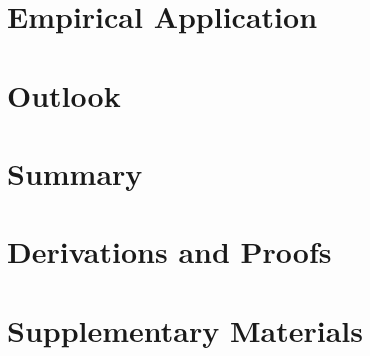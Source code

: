 \documentclass[a4paper,12pt,pagesize,DIV=calc,smallheadings,english]{article}
\theoremstyle{plain}
\begin{document}
\section{Empirical Application}
\label{sec:app}

\section{Outlook}
\label{sec:outl}

\section{Summary}
\label{sec:sum}

\appendix
\newpage
\section{Derivations and Proofs}
\label{app:deriv}

\newpage
\section{Supplementary Materials}
\label{app:deriv}

\newpage



\newpage
\nocite{*}
\printbibliography[heading=bibintoc] %
\end{document}
